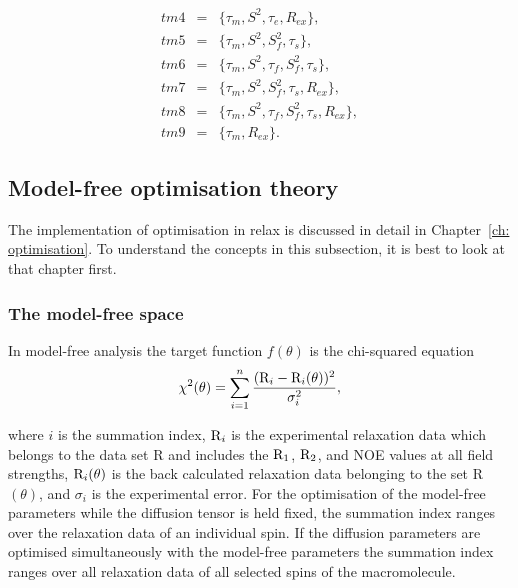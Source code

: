 \begin{htmlonly}
\begin{htmlonly}
\begin{htmlonly}
\begin{eqnarray}
 tm4 &=& \{\tau_m, S^2, \tau_e, R_{ex}\},                \label{model: tm4} \\
 tm5 &=& \{\tau_m, S^2, S^2_f, \tau_s\},                 \label{model: tm5} \\
 tm6 &=& \{\tau_m, S^2, \tau_f, S^2_f, \tau_s\},         \label{model: tm6} \\
 tm7 &=& \{\tau_m, S^2, S^2_f, \tau_s, R_{ex}\},         \label{model: tm7} \\
 tm8 &=& \{\tau_m, S^2, \tau_f, S^2_f, \tau_s, R_{ex}\}, \label{model: tm8} \\
 tm9 &=& \{\tau_m, R_{ex}\}.                             \label{model: tm9}
\end{eqnarray}
\end{htmlonly}





\subsection{Model-free optimisation theory}

The implementation of optimisation in relax is discussed in detail in Chapter~\ref{ch: optimisation}.
To understand the concepts in this subsection, it is best to look at that chapter first.


\subsubsection{The model-free space}

In model-free analysis the target function $f(\theta)$ is the chi-squared equation
\begin{equation} \label{eq: chi2 mf}
 \chi^2(\theta) = \sum_{i=1}^n \frac{(\mathrm{R}_i - \mathrm{R}_i(\theta))^2}{\sigma_i^2},
\end{equation}

\noindent where $i$ is the summation index, $\mathrm{R}_i$ is the experimental relaxation data which belongs to the data set R and includes the $\mathrm{R}_1$, $\mathrm{R}_2$, and NOE values at all field strengths, $\mathrm{R}_i(\theta)$ is the back calculated relaxation data belonging to the set R$(\theta)$, and $\sigma_i$ is the experimental error.
For the optimisation of the model-free parameters while the diffusion tensor is held fixed, the summation index ranges over the relaxation data of an individual spin.
If the diffusion parameters are optimised simultaneously with the model-free parameters the summation index ranges over all relaxation data of all selected spins of the macromolecule.


\end{htmlonly}
\end{htmlonly}
